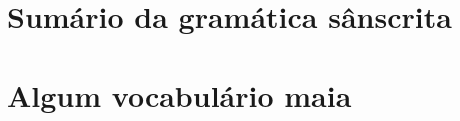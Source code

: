 \documentclass[a4paper]{ifacconf}
\begin{document}
                                                   







\appendix
\section{Sumário da gramática sânscrita}    %
\section{Algum vocabulário maia}              %
\end{document}
